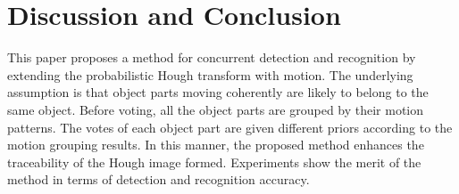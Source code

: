 \documentclass[10pt,twocolumn,letterpaper]{article}
\begin{document}
\section{Discussion and Conclusion}
This paper proposes a method for concurrent detection and recognition by extending the probabilistic Hough transform with motion. The underlying assumption is that object parts moving coherently are likely to belong to the same object. Before voting, all the object parts are grouped by their motion patterns. The votes of each object part are given different priors according to the motion grouping results. In this manner, the proposed method enhances the traceability of the Hough image formed. Experiments show the merit of the method in terms of detection and recognition accuracy.




{\small


}
\end{document}
